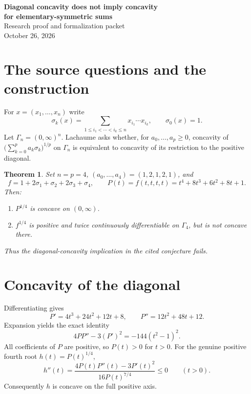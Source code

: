\documentclass[11pt]{article}
\newtheorem{theorem}{Theorem}
\begin{document}
\begin{center}
{\Large\bfseries Diagonal concavity does not imply concavity\\for elementary-symmetric sums}\\[.5em]
Research proof and formalization packet\\
October 26, 2026
\end{center}
\begin{abstract}
We refute Lachaume's diagonal-concavity conjecture with the explicit
symmetric polynomial $f=1+2\sigma_1+\sigma_2+2\sigma_3+\sigma_4$ in four
variables. Its diagonal restriction is $P(t)=t^4+8t^3+6t^2+8t+1$.
The identity $4PP''-3(P')^2=-144(t^2-1)^2$ proves concavity of $P^{1/4}$
on the whole positive axis, but an exact midpoint inequality shows that
$f^{1/4}$ is not concave on the positive orthant. All inputs and all five
coefficients are strictly positive. The complete statement, including the
literal elementary symmetric functions, is certified in Lean. A related
real-rootedness converse is already false by an older example and
translation, and is not claimed as a new result here.
\end{abstract}

\section{The source questions and the construction}
For $x=(x_1,\ldots,x_n)$ write
\[
 \sigma_k(x)=\sum_{1\le i_1<\cdots<i_k\le n}x_{i_1}\cdots x_{i_k},
 \qquad \sigma_0(x)=1.
\]
Let $\Gamma_n=(0,\infty)^n$. Lachaume \cite[Conjecture~1, p.~3]{L17}
asks whether, for $a_0,\ldots,a_p\ge0$, concavity of
$\bigl(\sum_{k=0}^p a_k\sigma_k\bigr)^{1/p}$ on $\Gamma_n$
is equivalent to concavity of its restriction to the positive diagonal.
\begin{theorem}\label{main}
Set $n=p=4$, $(a_0,\ldots,a_4)=(1,2,1,2,1)$, and
\[
 f=1+2\sigma_1+\sigma_2+2\sigma_3+\sigma_4,
 \qquad P(t)=f(t,t,t,t)=t^4+8t^3+6t^2+8t+1.
\]
Then:
\begin{enumerate}
\item $P^{1/4}$ is concave on $(0,\infty)$.
\item $f^{1/4}$ is positive and twice continuously differentiable on
$\Gamma_4$, but is not concave there.
\end{enumerate}
Thus the diagonal-concavity implication in the cited conjecture fails.
\end{theorem}

\section{Concavity of the diagonal}
Differentiating gives
\[
 P'=4t^3+24t^2+12t+8,\qquad P''=12t^2+48t+12.
\]
Expansion yields the exact identity
\begin{equation}\label{square}
 4PP''-3(P')^2=-144(t^2-1)^2.
\end{equation}
All coefficients of $P$ are positive, so $P(t)>0$ for $t>0$.
For the genuine positive fourth root $h(t)=P(t)^{1/4}$,
\[
 h''(t)=\frac{4P(t)P''(t)-3P'(t)^2}{16P(t)^{7/4}}\le0
 \qquad(t>0).
\]
Consequently $h$ is concave on the full positive axis.
\end{document}
